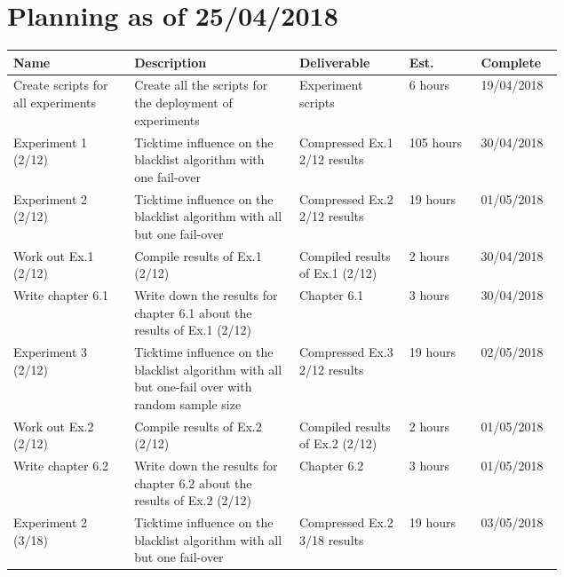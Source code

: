 
%
\section*{Planning as of 25/04/2018}
\begin{longtable}{| p{0.22\linewidth} | p{0.3\linewidth}| p{0.2\linewidth} | l | l |}
\hline
\textbf{Name} & \textbf{Description} & \textbf{Deliverable} & \textbf{Est.} & \textbf{Complete} \\ \hline

Create scripts for all experiments & Create all the scripts for the deployment of experiments & Experiment scripts & 6 hours & 19/04/2018 \\
\hline

Experiment 1 (2/12) & Ticktime influence on the blacklist algorithm with one fail-over & Compressed Ex.1 2/12 results & 105 hours & 30/04/2018 \\ 
\hline

Experiment 2 (2/12) & Ticktime influence on the blacklist algorithm with all but one fail-over & Compressed Ex.2 2/12 results & 19 hours & 01/05/2018 \\
\hline

Work out Ex.1 (2/12) & Compile results of Ex.1 (2/12) & Compiled results of Ex.1 (2/12) & 2 hours & 30/04/2018 \\
\hline  

Write chapter 6.1 & Write down the results for chapter 6.1 about the results of Ex.1 (2/12) & Chapter 6.1 & 3 hours & 30/04/2018 \\
\hline

Experiment 3 (2/12) & Ticktime influence on the blacklist algorithm with all but one-fail over with random sample size & Compressed Ex.3 2/12 results & 19 hours & 02/05/2018 \\
\hline

Work out Ex.2 (2/12) & Compile results of Ex.2 (2/12) & Compiled results of Ex.2 (2/12) & 2 hours & 01/05/2018 \\
\hline 

Write chapter 6.2 & Write down the results for chapter 6.2 about the results of Ex.2 (2/12) & Chapter 6.2 & 3 hours & 01/05/2018 \\
\hline

Experiment 2 (3/18) & Ticktime influence on the blacklist algorithm with all but one fail-over & Compressed Ex.2 3/18 results & 19 hours & 03/05/2018 \\
\hline


\end{longtable}
